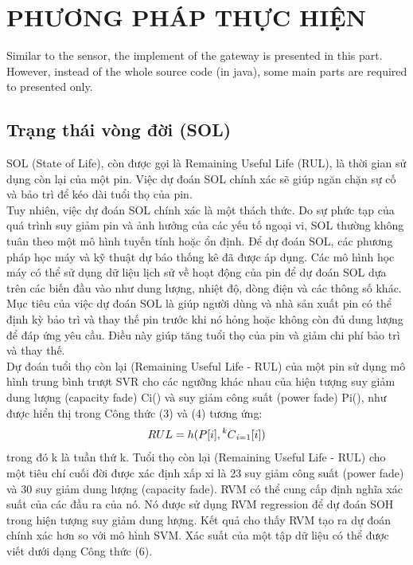 \documentclass[a4paper,13pt]{article}
\newcommand\Mycomb[2][^n]{\prescript{#1\mkern-0.5mu}{}C_{#2}}
\theoremstyle{mytheor}
\begin{document}
\section{PHƯƠNG PHÁP THỰC HIỆN}
Similar to the sensor, the implement of the gateway is presented in this part. However, instead of the whole source code (in java), some main parts are required to presented only.

\subsection{Trạng thái vòng đời (SOL)}

SOL (State of Life), còn được gọi là Remaining Useful Life (RUL), là thời gian sử dụng còn lại của một pin. Việc dự đoán SOL chính xác sẽ giúp ngăn chặn sự cố và bảo trì để kéo dài tuổi thọ của pin.\\
Tuy nhiên, việc dự đoán SOL chính xác là một thách thức. Do sự phức tạp của quá trình suy giảm pin và ảnh hưởng của các yếu tố ngoại vi, SOL thường không tuân theo một mô hình tuyến tính hoặc ổn định. Để dự đoán SOL, các phương pháp học máy và kỹ thuật dự báo thống kê đã được áp dụng. Các mô hình học máy có thể sử dụng dữ liệu lịch sử về hoạt động của pin để dự đoán SOL dựa trên các biến đầu vào như dung lượng, nhiệt độ, dòng điện và các thông số khác.\\
Mục tiêu của việc dự đoán SOL là giúp người dùng và nhà sản xuất pin có thể định kỳ bảo trì và thay thế pin trước khi nó hỏng hoặc không còn đủ dung lượng để đáp ứng yêu cầu. Điều này giúp tăng tuổi thọ của pin và giảm chi phí bảo trì và thay thế.\\

Dự đoán tuổi thọ còn lại (Remaining Useful Life - RUL) của một pin sử dụng mô hình trung bình trượt SVR cho các ngưỡng khác nhau của hiện tượng suy giảm dung lượng (capacity fade) Ci() và suy giảm công suất (power fade) Pi(), như được hiển thị trong Công thức (3) và (4) tương ứng:\\
\[RUL = h(P[i],\Mycomb[k]{i=1}[i]) \]
trong đó k là tuần thứ k. Tuổi thọ còn lại (Remaining Useful Life - RUL) cho một tiêu chí cuối đời được xác định xấp xỉ là 23 suy giảm công suất (power fade) và 30 suy giảm dung lượng (capacity fade).
RVM có thể cung cấp định nghĩa xác suất của các đầu ra của nó. Nó được sử dụng RVM regression để dự đoán SOH trong hiện tượng suy giảm dung lượng. Kết quả cho thấy RVM tạo ra dự đoán chính xác hơn so với mô hình SVM. Xác suất của một tập dữ liệu có thể được viết dưới dạng Công thức (6).\\
\end{document}
